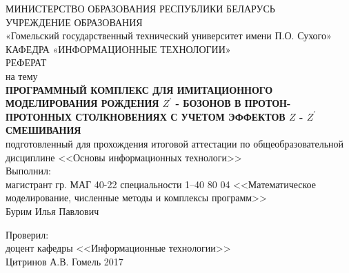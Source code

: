 \begin{titlepage}
	\large
	\begin{center}
		\vspace{3mm}
		МИНИСТЕРСТВО ОБРАЗОВАНИЯ РЕСПУБЛИКИ БЕЛАРУСЬ\\
		УЧРЕЖДЕНИЕ ОБРАЗОВАНИЯ\\
		«Гомельский государственный технический университет имени П.О. Сухого»\\
		\vspace{10mm}
		КАФЕДРА «ИНФОРМАЦИОННЫЕ ТЕХНОЛОГИИ»\\
		\vspace{30mm}
		РЕФЕРАТ\\
		на тему\\
			\textbf{\MakeTextUppercase{ Программный комплекс для имитационного моделирования рождения $Z^\prime$ - бозонов в протон-протонных столкновениях с учетом эффектов $Z$ - $Z^\prime$ смешивания
		}}\\
	\vspace{5mm}
		подготовленный для прохождения итоговой аттестации 
		по общеобразовательной дисциплине 
		<<Основы информационных технологи>>\\
	\vspace{40mm}
		Выполнил:\\
		магистрант гр. МАГ 40-22
		специальности 1–40 80 04 <<Математическое моделирование, численные методы и комплексы программ>>\\
		Бурим Илья Павлович
		
	\vspace{15mm}
		Проверил:\\
		доцент кафедры <<Информационные технологии>>\\
		Цитринов А.В.
	\vfill
		Гомель 2017
	\end{center}
\end{titlepage}
